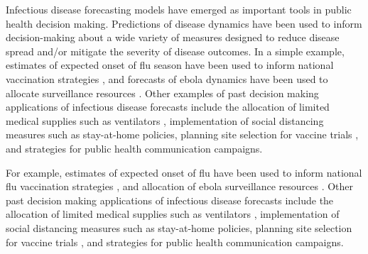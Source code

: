 \documentclass{article}
\begin{document}





Infectious disease forecasting models have emerged as important tools in public health decision making. Predictions of disease dynamics have been used to inform decision-making about a wide variety of measures designed to reduce disease spread and/or mitigate the severity of disease outcomes. In a simple example, estimates of expected onset of flu season have been used to inform national vaccination strategies  \cite{igboh2023timing}, and forecasts of ebola dynamics have been used to allocate surveillance resources \cite{meltzer2014estimating}. Other examples of past decision making applications of infectious disease forecasts include the allocation of limited medical supplies such as ventilators \cite{bertsimas2021predictionsCOVID}, implementation of social distancing measures such as stay-at-home policies, planning site selection for vaccine trials \cite{bertsimas2021predictionsCOVID}, and strategies for public health communication campaigns.

For example, estimates of expected onset of flu have been used to inform national flu vaccination strategies \cite{igboh2023timing}, and allocation of ebola surveillance resources \cite{meltzer2014estimating}.  Other past decision making applications of infectious disease forecasts include the allocation of limited medical supplies such as ventilators \cite{bertsimas2021predictionsCOVID}, implementation of social distancing measures such as stay-at-home policies, planning site selection for vaccine trials \cite{bertsimas2021predictionsCOVID}, and strategies for public health communication campaigns.
\end{document}
